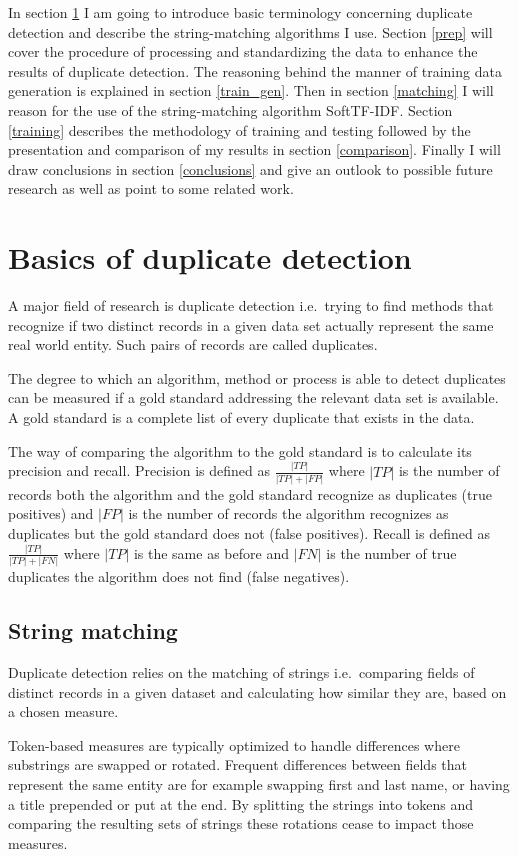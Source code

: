 \documentclass[conference]{IEEEtran}
\begin{document}
In section \ref{basics} I am going to introduce basic terminology concerning duplicate detection and describe the string-matching algorithms I use. Section \ref{prep} will cover the procedure of processing and standardizing the data to enhance the results of duplicate detection. The reasoning behind the manner of training data generation is explained in section \ref{train_gen}. Then in section \ref{matching} I will reason for the use of the string-matching algorithm SoftTF-IDF. Section \ref{training} describes the methodology of training and testing followed by the presentation and comparison of my results in section \ref{comparison}. Finally I will draw conclusions in section \ref{conclusions} and give an outlook to possible future research as well as point to some related work.
\section{Basics of duplicate detection}\label{basics}
A major field of research is duplicate detection i.e.\ trying to find methods that recognize if two distinct records in a given data set actually represent the same real world entity. Such pairs of records are called duplicates.

The degree to which an algorithm, method or process is able to detect duplicates can be measured if a gold standard addressing the relevant data set is available. A gold standard is a complete list of every duplicate that exists in the data.

The way of comparing the algorithm to the gold standard is to calculate its precision and recall. Precision is defined as $\frac{|TP|}{|TP|+|FP|}$ where $|TP|$ is the number of records both the algorithm and the gold standard recognize as duplicates (true positives) and $|FP|$ is the number of records the algorithm recognizes as duplicates but the gold standard does not (false positives). Recall is defined as $\frac{|TP|}{|TP|+|FN|}$ where $|TP|$ is the same as before and $|FN|$ is the number of true duplicates the algorithm does not find (false negatives).

\subsection{String matching}
Duplicate detection relies on the matching of strings i.e.\ comparing fields of distinct records in a given dataset and calculating how similar they are, based on a chosen measure.

Token-based measures are typically optimized to handle differences where substrings are swapped or rotated. Frequent differences between fields that represent the same entity are for example swapping first and last name, or having a title prepended or put at the end. By splitting the strings into tokens and comparing the resulting sets of strings these rotations cease to impact those measures.
\end{document}
